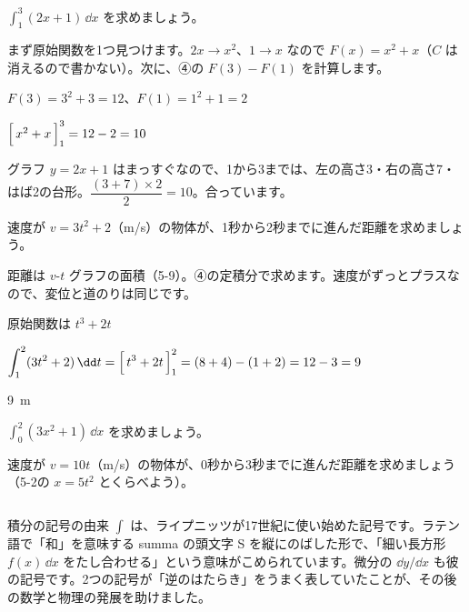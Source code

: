 \begin{reidai}[定積分]
$\displaystyle\int_1^3(2x+1)\,\dd x$ を求めましょう。\par
\kangaekata まず原始関数を1つ見つけます。$2x\to x^2$、$1\to x$ なので $F(x)=x^2+x$（$C$ は消えるので書かない）。次に、④の $F(3)-F(1)$ を計算します。\par
\shiki $F(3)=3^2+3=12$、\quad$F(1)=1^2+1=2$\par
\hspace*{2.6\zw}$\Bigl[\,x^2+x\,\Bigr]_1^3=12-2=10$\par
{}グラフ $y=2x+1$ はまっすぐなので、1から3までは、左の高さ3・右の高さ7・はば2の台形。$\dfrac{(3+7)\times2}{2}=10$。合っています。\par
{}
\end{reidai}

\begin{reidai}[速度から進んだ距離]
速度が $v=3t^2+2$（m/s）の物体が、1秒から2秒までに進んだ距離を求めましょう。\par
\kangaekata 距離は $v$-$t$ グラフの面積（5-9）。④の定積分で求めます。速度がずっとプラスなので、変位と道のりは同じです。\par
\shiki 原始関数は $t^3+2t$\par
\hspace*{2.6\zw}$\displaystyle\int_1^2(3t^2+2)\,\dd t=\Bigl[\,t^3+2t\,\Bigr]_1^2=(8+4)-(1+2)=12-3=9$\par
\kotae \qty{9}{m}
\end{reidai}

\noindent\begin{minipage}[t]{0.485\linewidth}\vspace{0pt}\raggedright
\begin{jibun}
$\displaystyle\int_0^2(3x^2+1)\,\dd x$ を求めましょう。
\end{jibun}
\end{minipage}\hfill
\begin{minipage}[t]{0.485\linewidth}\vspace{0pt}\raggedright
\begin{jibun}
速度が $v=10t$（m/s）の物体が、0秒から3秒までに進んだ距離を求めましょう（5-2の $x=5t^2$ とくらべよう）。
\end{jibun}
\end{minipage}

\begin{column}{積分の記号の由来}
$\int$ は、ライプニッツが17世紀に使い始めた記号です。ラテン語で「和」を意味する summa の頭文字 S を縦にのばした形で、「細い長方形 $f(x)\,\dd x$ をたし合わせる」という意味がこめられています。微分の $\dd y/\dd x$ も彼の記号です。2つの記号が「逆のはたらき」をうまく表していたことが、その後の数学と物理の発展を助けました。
\end{column}

